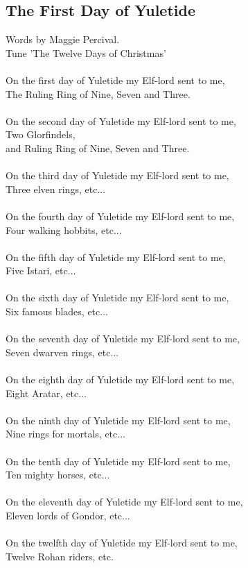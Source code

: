 \begin{multicols}{2}
\section{The First Day of Yuletide}
Words by Maggie Percival.
\\
Tune ’The Twelve Days of Christmas’
\\
\\
On the first day of Yuletide my Elf-lord sent to me,
\\
The Ruling Ring of Nine, Seven and Three.
\\
\\
On the second day of Yuletide my Elf-lord sent to me,
\\
Two Glorfindels,
\\
and Ruling Ring of Nine, Seven and Three.
\\
\\
On the third day of Yuletide my Elf-lord sent to me,
\\
Three elven rings, etc...
\\
\\
On the fourth day of Yuletide my Elf-lord sent to me,
\\
Four walking hobbits, etc...
\\
\\
On the fifth day of Yuletide my Elf-lord sent to me,
\\
Five Istari, etc...
\\
\\
On the sixth day of Yuletide my Elf-lord sent to me,
\\
Six famous blades, etc...
\\
\\
On the seventh day of Yuletide my Elf-lord sent to me,
\\
Seven dwarven rings, etc...
\\
\\
On the eighth day of Yuletide my Elf-lord sent to me,
\\
Eight Aratar, etc...
\\
\\
On the ninth day of Yuletide my Elf-lord sent to me,
\\
Nine rings for mortals, etc...
\\
\\
On the tenth day of Yuletide my Elf-lord sent to me,
\\
Ten mighty horses, etc...
\\
\\
On the eleventh day of Yuletide my Elf-lord sent to me,
\\
Eleven lords of Gondor, etc...
\\
\\
On the twelfth day of Yuletide my Elf-lord sent to me,
\\
Twelve Rohan riders, etc.
\\
\\
\\
\\
\end{multicols}
